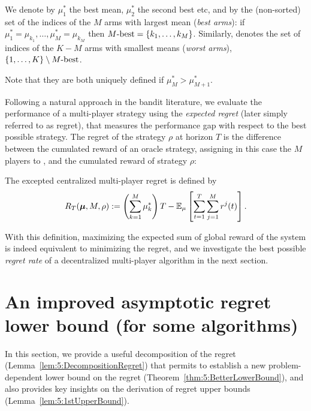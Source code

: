 \begin{definition}\label{def:5:MbestMworst}
  We denote by $\mu_1^*$ the best mean, $\mu_2^*$ the second best etc, and
  by \Mbest{} the (non-sorted) set of the indices of the $M$ arms with largest mean (\emph{best arms}): if $\mu_1^* = \mu_{k_1}, \dots, \mu_M^* = \mu_{k_M}$
  then $M\text{-}\mathrm{best} = \{k_1, \dots, k_M\}$.
  Similarly, \Mworst{} denotes the set of indices of the $K-M$ arms with smallest means (\emph{worst arms}),
  $\{1, \dots, K\} \setminus M\text{-}\mathrm{best}$.

  Note that they are both uniquely defined if $\mu_M^* > \mu_{M+1}^*$.
\end{definition}

Following a natural approach in the bandit literature, we evaluate the performance of a multi-player strategy using the \emph{expected regret} (later simply referred to as regret), that measures the performance gap with respect to the best possible strategy.
The regret of the strategy $\rho$ at horizon $T$ is the difference between the cumulated reward of an oracle strategy, assigning in this case the $M$ players to \Mbest,
and the cumulated reward of strategy $\rho$:

\begin{definition}
  The excepted centralized multi-player regret is defined by
  \begin{equation}\label{eq:5:regret}
    R_T(\boldsymbol{\mu}, M, \rho) := \left(\sum_{k=1}^{M}\mu_k^*\right)T - \mathbb{E}_{\mu}\left[\sum_{t=1}^T\sum_{j=1}^M r^j(t)\right].
  \end{equation}
\end{definition}

With this definition, maximizing the expected sum of global reward of the system is indeed equivalent to minimizing the regret, and we investigate the best possible \emph{regret rate} of a decentralized multi-player algorithm in the next section.



\section{An improved asymptotic regret lower bound (for some algorithms)}
\label{sec:5:lowerbound}

In this section, we provide a useful decomposition of the regret (Lemma~\ref{lem:5:DecompositionRegret}) that permits to establish a new problem-dependent lower bound on the regret (Theorem~\ref{thm:5:BetterLowerBound}), and also provides key insights on the derivation of regret upper bounds (Lemma~\ref{lem:5:1stUpperBound}).

